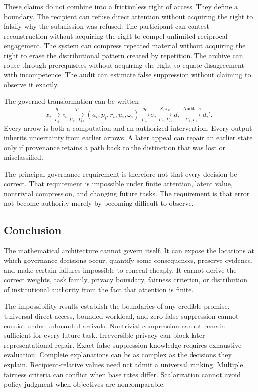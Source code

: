 \documentclass[11pt]{article}
\theoremstyle{definition}
\DeclareMathOperator{\Audit}{Audit}
\newcommand{\K}{\mathcal{K}}
\begin{document}
These claims do not combine into a frictionless right of access. They define a boundary. The recipient can refuse direct attention without acquiring the right to falsify why the submission was refused. The participant can contest reconstruction without acquiring the right to compel unlimited reciprocal engagement. The system can compress repeated material without acquiring the right to erase the distributional pattern created by repetition. The archive can route through prerequisites without acquiring the right to equate disagreement with incompetence. The audit can estimate false suppression without claiming to observe it exactly.

The governed transformation can be written
\[
x_i
\xrightarrow[\Gamma_q]{q}
z_i
\xrightarrow[\Gamma_{\K},\Gamma_G]{T}
(a_i,p_i,r_i,u_i,\omega_i)
\xrightarrow[\Gamma_{\mathcal{H}}]{\mathcal{H}}
\sigma_i
\xrightarrow[\Gamma_S,\Gamma_E]{S,\pi_E}
d_i
\xrightarrow[\Gamma_A,\Gamma_{\mathfrak{a}}]{\Audit,\mathfrak{a}}
d_i'.
\]
Every arrow is both a computation and an authorized intervention. Every output inherits uncertainty from earlier arrows. A later appeal can repair an earlier state only if provenance retains a path back to the distinction that was lost or misclassified.

The principal governance requirement is therefore not that every decision be correct. That requirement is impossible under finite attention, latent value, nontrivial compression, and changing future tasks. The requirement is that error not become authority merely by becoming difficult to observe.

\subsection{Conclusion}

The mathematical architecture cannot govern itself. It can expose the locations at which governance decisions occur, quantify some consequences, preserve evidence, and make certain failures impossible to conceal cheaply. It cannot derive the correct weights, task family, privacy boundary, fairness criterion, or distribution of institutional authority from the fact that attention is finite.

The impossibility results establish the boundaries of any credible promise. Universal direct access, bounded workload, and zero false suppression cannot coexist under unbounded arrivals. Nontrivial compression cannot remain sufficient for every future task. Irreversible privacy can block later representational repair. Exact false-suppression knowledge requires exhaustive evaluation. Complete explanations can be as complex as the decisions they explain. Recipient-relative values need not admit a universal ranking. Multiple fairness criteria can conflict when base rates differ. Scalarization cannot avoid policy judgment when objectives are noncomparable.
\end{document}

